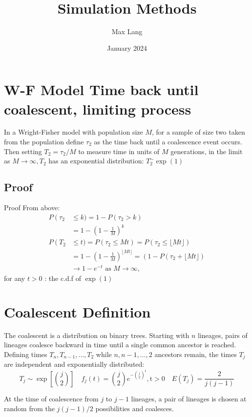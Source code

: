 \documentclass{article}
\title{Simulation Methods}
\author{Max Lang}
\date{January 2024}
\begin{document}
\maketitle


\section{W-F Model Time back until coalescent, limiting process}
In a Wright-Fisher model with population size $M$, for a sample of size two taken from the population define $\tau_2$ as the time back until a coalescence event occurs. Then setting $T_2=\tau_2 / M$ to measure time in units of $M$ generations, in the limit as $M \rightarrow \infty, T_2$ has an exponential distribution: $T_2^{\sim} \exp (1)$

\subsection{Proof}
Proof From above:
$$
\begin{aligned}
P\left(\tau_2\right. & \leq k)=1-P\left(\tau_2>k\right) \\
& =1-\left(1-\frac{1}{M}\right)^k \\
P\left(T_2\right. & \leq t)=P\left(\tau_2 \leq M t\right)=P\left(\tau_2 \leq\lfloor M t\rfloor\right) \\
& =1-\left(1-\frac{1}{M}\right)^{\lfloor M t\rfloor}=\left(1-P\left(\tau_2 +
\lfloor M t\rfloor\right)\right. \\
& \rightarrow 1-e^{-t} \text { as } M \rightarrow \infty,
\end{aligned}
$$
for any $t>0$ : the c.d.f of $\exp (1)$


\section{Coalescent Definition }
The coalescent is a distribution on binary trees. Starting with $n$ lineages, pairs of lineages coalesce backward in time until a single common ancestor is reached. Defining times $T_n, T_{n-1}, \ldots, T_2$ while $n, n-1, \ldots, 2$ ancestors remain, the times $T_j$ are independent and exponentially distributed:
$$
T_j \sim \exp \left[\binom{j}{2}\right] \quad f_j(t)=\binom{j}{2} e^{-\binom{j}{2}^t}, \mathrm{t}>0 \quad E\left(T_j\right)=\frac{2}{j(j-1)}
$$

At the time of coalescence from $j$ to $j-1$ lineages, a pair of lineages is chosen at random from the $j(j-1) / 2$ possibilities and coalesces.
\end{document}
